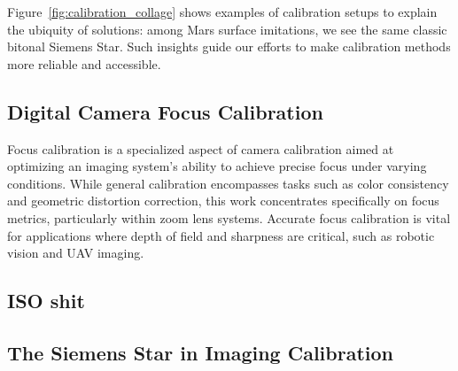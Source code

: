 \documentclass[main]{subfiles}
\begin{document}
  Figure~\ref{fig:calibration_collage} shows examples of calibration setups to explain the ubiquity of solutions: among Mars surface imitations, we see the same classic bitonal Siemens Star. Such insights guide our efforts to make calibration methods more reliable and accessible.


\subsection{Digital Camera Focus Calibration}
  \label{sec:focus_calibration}

  Focus calibration is a specialized aspect of camera calibration aimed at optimizing an imaging system's ability to achieve precise focus under varying conditions. While general calibration encompasses tasks such as color consistency and geometric distortion correction, this work concentrates specifically on focus metrics, particularly within zoom lens systems. Accurate focus calibration is vital for applications where depth of field and sharpness are critical, such as robotic vision and UAV imaging.


\subsection{ISO shit}




  \subsection{The Siemens Star in Imaging Calibration}
  \label{sec:siemens_star}
\end{document}
